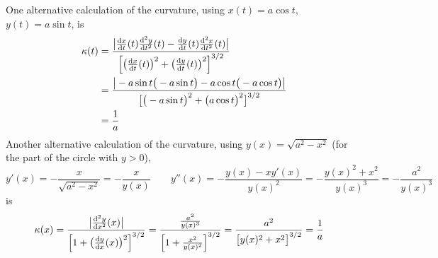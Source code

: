 \begin{eg}
One alternative calculation of the curvature, using $x(t) = a\cos t $,
$y(t)=a\sin t$, is
\begin{align*}
\ka(t)
&=\frac{\big|
  \diff{x}{t}(t)\difftwo{y}{t}(t)-\diff{y}{t}(t)\difftwo{x}{t}(t)
  \big|}{\Big[\big(\diff{x}{t}(t)\big)^2
                +\big(\diff{y}{t}(t)\big)^2\Big]^{3/2}} \\
&=\frac{\big|
  -a\sin t\big(-a\sin t\big)-a\cos t\big(-a\cos t\big)
  \big|}{\big[\big(-a\sin t\big)^2
                +\big(a\cos t\big)^2\big]^{3/2}} \\
&=\frac{1}{a}
\end{align*}
Another alternative calculation of the curvature, using $y(x) 
=\sqrt{a^2-x^2}$ (for the part of the circle with $y>0$),
\begin{equation*}
y'(x) = -\frac{x}{\sqrt{a^2-x^2}}=-\frac{x}{y(x)} \qquad
y''(x) = -\frac{y(x) - xy'(x)}{y(x)^2}
       =  -\frac{y(x)^2 + x^2}{y(x)^3}
       =  -\frac{a^2}{y(x)^3}
\end{equation*}
is 
\begin{align*}
\ka(x)
&=\frac{\big|\difftwo{y}{x}(x)\big|}
  {\Big[1+\big(\diff{y}{x}(x)\big)^2\Big]^{3/2}} 
=\frac{\frac{a^2}{y(x)^3}}
  {\Big[1+\frac{x^2}{y(x)^2}\Big]^{3/2}}
=\frac{a^2}{\big[y(x)^2+x^2\big]^{3/2}}
=\frac{1}{a}
\end{align*}
\end{eg}



